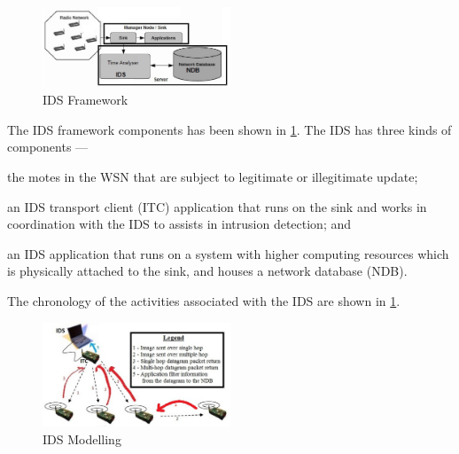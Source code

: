 \documentclass[conference,final]{IEEEtran}
\begin{document}
\begin{figure}[btp]
    \centering
    \includegraphics[width=0.5\textwidth]{IDS_fw}	
    \caption{IDS Framework}
    \label{fig:ids_fw}
\end{figure}
The IDS framework components has been shown in \ref{fig:ids_fw}.
The IDS has three kinds of components --- 
\begin{inparaenum}
\item the motes in the WSN that are subject to legitimate or illegitimate update; 
\item an IDS transport client (ITC) application that runs on the sink and works in coordination with the IDS to assists in intrusion detection; and
\item an IDS application that runs on a system with higher computing resources which is physically attached to the sink, and houses a network database (NDB).
\end{inparaenum}
The chronology of the activities associated with the IDS  are shown in  \ref{fig:ids_fw}.
\begin{figure}[btp]
    \centering
    \includegraphics[width=0.5\textwidth]{IDS}
    \caption{IDS Modelling}
    \label{fig:ids_model}
\end{figure}
\end{document}
